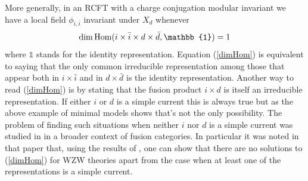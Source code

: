 \documentclass[a4paper,11pt]{article}
\theoremstyle{plain}
\theoremstyle{definition}
\def\be{\begin{equation}}
\def\ee{\end{equation}}
\begin{document}
More generally, in an RCFT with a charge conjugation modular invariant we have a local field $\phi_{i,\overline{i}}$ invariant under $X_{d}$ whenever 
\be \label{dimHom}
{\rm dim}\, {\rm Hom}(i\times \bar i\times d \times \bar d, \mathbb{1}) = 1
\ee
where $\mathbb{1}$ stands for the identity representation.
Equation (\ref{dimHom}) is equivalent to saying that the only common irreducible representation among those that appear both in $i\times \bar i$ and in $d\times \bar d$ is 
the identity representation. Another way to read (\ref{dimHom}) is by stating that the fusion product $i\times d$ is itself an irreducible representation. 
If either $i$ or $d$ is a simple current this is always true but as the above example of minimal models shows that's not the only possibility.
The problem of finding such situations when neither $i$ nor $d$ is a simple current was studied in \cite{Buican} in a broader context of fusion categories. 
In particular it was noted in that paper that, using the results of \cite{WZWtadpole}, one can show that  there are no solutions to (\ref{dimHom}) for WZW theories apart from the case when at least one of the representations is a simple current. 
 



\end{document}
